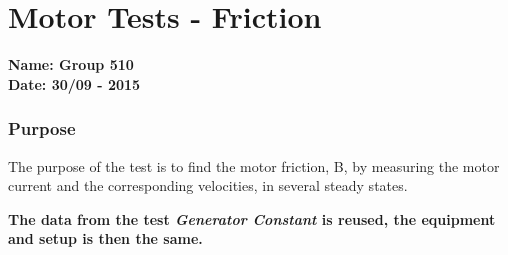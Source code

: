 \pagebreak
\section{Motor Tests - Friction} \label{app:motorTestFriction}
\textbf{Name: Group 510}\\
\textbf{Date: 30/09 - 2015}

\subsubsection{Purpose}
The purpose of the test is to find the motor friction, B, by measuring the motor current and the corresponding velocities, in several steady states.

\textbf{The data from the test \textit{Generator Constant} is reused, the equipment and setup is then the same.}

